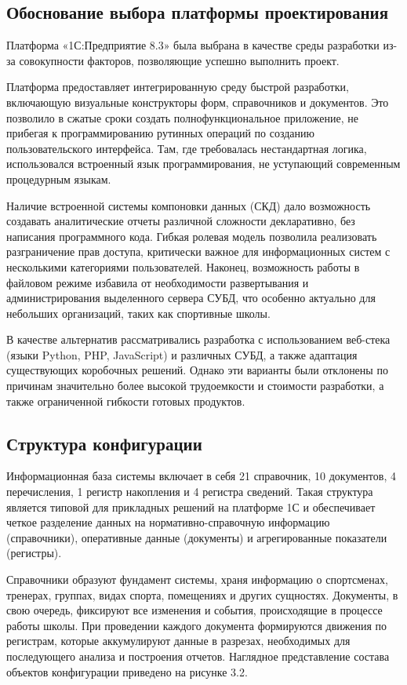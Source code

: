 \subsection{Обоснование выбора платформы проектирования}

Платформа «1С:Предприятие 8.3» была выбрана в качестве среды разработки из-за совокупности факторов, позволяющие успешно выполнить проект.

Платформа предоставляет интегрированную среду быстрой разработки, включающую визуальные конструкторы форм, справочников и документов. Это позволило в сжатые сроки создать полнофункциональное приложение, не прибегая к программированию рутинных операций по созданию пользовательского интерфейса. Там, где требовалась нестандартная логика, использовался встроенный язык программирования, не уступающий современным процедурным языкам.

Наличие встроенной системы компоновки данных (СКД) дало возможность создавать аналитические отчеты различной сложности декларативно, без написания программного кода. Гибкая ролевая модель позволила реализовать разграничение прав доступа, критически важное для информационных систем с несколькими категориями пользователей. Наконец, возможность работы в файловом режиме избавила от необходимости развертывания и администрирования выделенного сервера СУБД, что особенно актуально для небольших организаций, таких как спортивные школы.

В качестве альтернатив рассматривались разработка с использованием веб-стека (языки Python, PHP, JavaScript) и различных СУБД, а также адаптация существующих коробочных решений. Однако эти варианты были отклонены по причинам значительно более высокой трудоемкости и стоимости разработки, а также ограниченной гибкости готовых продуктов.

\subsection{Структура конфигурации}

Информационная база системы включает в себя 21 справочник, 10 документов, 4 перечисления, 1 регистр накопления и 4 регистра сведений. Такая структура является типовой для прикладных решений на платформе 1С и обеспечивает четкое разделение данных на нормативно-справочную информацию (справочники), оперативные данные (документы) и агрегированные показатели (регистры).

Справочники образуют фундамент системы, храня информацию о спортсменах, тренерах, группах, видах спорта, помещениях и других сущностях. Документы, в свою очередь, фиксируют все изменения и события, происходящие в процессе работы школы. При проведении каждого документа формируются движения по регистрам, которые аккумулируют данные в разрезах, необходимых для последующего анализа и построения отчетов. Наглядное представление состава объектов конфигурации приведено на рисунке 3.2.


